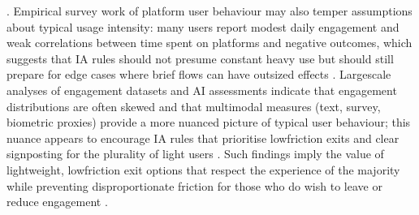 \documentclass{article}
\begin{document}
\parencites[8]{7808872}[6]{4807303}. Empirical survey work of platform user behaviour may also temper assumptions about typical usage intensity: many users report modest daily engagement and weak correlations between time spent on platforms and negative outcomes, which suggests that IA rules should not presume constant heavy use but should still prepare for edge cases where brief flows can have outsized effects \parencites[11204]{4153678}. Large\-scale analyses of engagement datasets and AI assessments indicate that engagement distributions are often skewed and that multimodal measures (text, survey, biometric proxies) provide a more nuanced picture of typical user behaviour; this nuance appears to encourage IA rules that prioritise low\-friction exits and clear signposting for the plurality of light users \parencites[2]{2882594}. Such findings imply the value of lightweight, low\-friction exit options that respect the experience of the majority while preventing disproportionate friction for those who do wish to leave or reduce engagement \parencites[11204]{4153678}.
\end{document}
